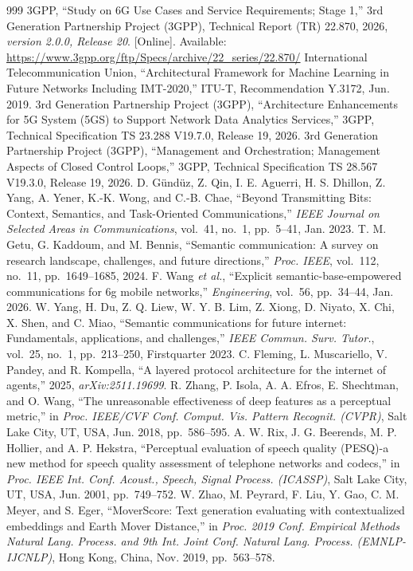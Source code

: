 \begin{thebibliography}{999}
 3GPP, ``Study on 6G Use Cases and Service Requirements; Stage 1,'' 3rd Generation Partnership Project (3GPP), Technical Report (TR) 22.870, 2026, \emph{version 2.0.0, Release 20}. [Online]. Available: \url{https://www.3gpp.org/ftp/Specs/archive/22_series/22.870/}
 International Telecommunication Union, ``Architectural Framework for Machine Learning in Future Networks Including IMT-2020,'' ITU-T, Recommendation Y.3172, Jun. 2019.
 3rd Generation Partnership Project (3GPP), ``Architecture Enhancements for 5G System (5GS) to Support Network Data Analytics Services,'' 3GPP, Technical Specification TS 23.288 V19.7.0, Release 19, 2026.
 3rd Generation Partnership Project (3GPP), ``Management and Orchestration; Management Aspects of Closed Control Loops,'' 3GPP, Technical Specification TS 28.567 V19.3.0, Release 19, 2026.
 D. Gündüz, Z. Qin, I. E. Aguerri, H. S. Dhillon, Z. Yang, A. Yener, K.-K. Wong, and C.-B. Chae, ``Beyond Transmitting Bits: Context, Semantics, and Task-Oriented Communications,'' \emph{IEEE Journal on Selected Areas in Communications}, vol.~41, no.~1, pp.~5--41, Jan. 2023.
 T. M. Getu, G. Kaddoum, and M. Bennis, ``Semantic communication: A survey on research landscape, challenges, and future directions,'' \emph{Proc. IEEE}, vol.~112, no.~11, pp.~1649--1685, 2024.
 F. Wang \emph{et al.}, ``Explicit semantic-base-empowered communications for 6g mobile networks,'' \emph{Engineering}, vol.~56, pp.~34--44, Jan. 2026.
 W. Yang, H. Du, Z. Q. Liew, W. Y. B. Lim, Z. Xiong, D. Niyato, X. Chi, X. Shen, and C. Miao, ``Semantic communications for future internet: Fundamentals, applications, and challenges,'' \emph{IEEE Commun. Surv. Tutor.}, vol.~25, no.~1, pp.~213--250, Firstquarter 2023.
 C. Fleming, L. Muscariello, V. Pandey, and R. Kompella, ``A layered protocol architecture for the internet of agents,'' 2025, \emph{arXiv:2511.19699}.
 R. Zhang, P. Isola, A. A. Efros, E. Shechtman, and O. Wang, ``The unreasonable effectiveness of deep features as a perceptual metric,'' in \emph{Proc. IEEE/CVF Conf. Comput. Vis. Pattern Recognit. (CVPR)}, Salt Lake City, UT, USA, Jun. 2018, pp.~586--595.
 A. W. Rix, J. G. Beerends, M. P. Hollier, and A. P. Hekstra, ``Perceptual evaluation of speech quality (PESQ)-a new method for speech quality assessment of telephone networks and codecs,'' in \emph{Proc. IEEE Int. Conf. Acoust., Speech, Signal Process. (ICASSP)}, Salt Lake City, UT, USA, Jun. 2001, pp.~749--752.
 W. Zhao, M. Peyrard, F. Liu, Y. Gao, C. M. Meyer, and S. Eger, ``MoverScore: Text generation evaluating with contextualized embeddings and Earth Mover Distance,'' in \emph{Proc. 2019 Conf. Empirical Methods Natural Lang. Process. and 9th Int. Joint Conf. Natural Lang. Process. (EMNLP-IJCNLP)}, Hong Kong, China, Nov. 2019, pp.~563--578.

\end{thebibliography}
